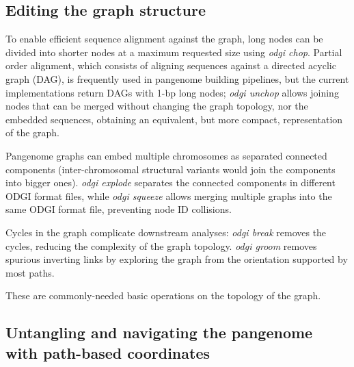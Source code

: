 \documentclass{bioinfo}
\begin{document}


\subsection{Editing the graph structure}
\label{sec:edit}



To enable efficient sequence alignment against the graph, long nodes can be divided into shorter nodes at a maximum requested size using \textit{odgi chop}. Partial order alignment, which consists of aligning sequences against a directed acyclic graph (DAG), is frequently used in pangenome building pipelines, but the current implementations return DAGs with 1-bp long nodes; \textit{odgi unchop} allows joining nodes that can be merged without changing the graph topology, nor the embedded sequences, obtaining an equivalent, but more compact, representation of the graph.

Pangenome graphs can embed multiple chromosomes as separated connected components (inter-chromosomal structural variants would join the components into bigger ones).
\textit{odgi explode} separates the connected components in different ODGI format files, while \textit{odgi squeeze} allows merging multiple graphs into the same ODGI format file, preventing node ID collisions.

Cycles in the graph complicate downstream analyses: \textit{odgi break} removes the cycles, reducing the complexity of the graph topology.
\textit{odgi groom} removes spurious inverting links by exploring the graph from the orientation supported by most paths.



These are commonly-needed basic operations on the topology of the graph.



\subsection{Untangling and navigating the pangenome with path-based coordinates}
\label{sec:untangle}

\end{document}
